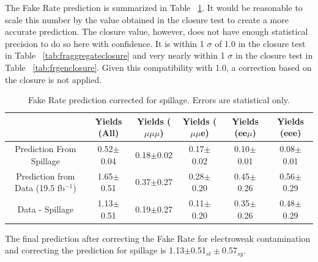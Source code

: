 The Fake Rate prediction is summarized in Table ~\ref{tab:FRPrediction}. It would be reasonable to scale this number by the value obtained in the closure test to create a more accurate prediction. The closure value, however, does not have enough statistical precision to do so here with confidence. It is within 1 $\sigma$ of 1.0 in the closure test in Table ~\ref{tab:fraggregateclosure} and very nearly within 1 $\sigma$ in the closure test in Table ~\ref{tab:frgenclosure}. Given this compatibility with 1.0, a correction based on the closure is not applied.\\

\begin{table}[ht!]
\begin{center}
\caption{\small \label{tab:FRPrediction} Fake Rate prediction corrected for spillage. Errors are statistical only.}
\begin{tabular}{c|ccccc}\hline
                                              &Yields (All)      &Yields ($\mu\mu\mu$)  &Yields ($\mu\mu$e)  &Yields (ee$\mu$)  &Yields (eee)\\
\hline \hline
Prediction From Spillage                      & 0.52$\pm$0.04   & 0.18$\pm$0.02   & 0.17$\pm$0.02   & 0.10$\pm$0.01   & 0.08$\pm$0.01 \\ 
\hline
Prediction from Data (19.5 fb$^{-1}$)          & 1.65$\pm$0.51   & 0.37$\pm$0.27   & 0.28$\pm$0.20   & 0.45$\pm$0.26   & 0.56$\pm$0.29 \\
\hline
Data - Spillage                               & 1.13$\pm$0.51   & 0.19$\pm$0.27   & 0.11$\pm$0.20   & 0.35$\pm$0.26   & 0.48$\pm$0.29 \\
\end{tabular}
\end{center}
\end{table}


The final prediction after correcting the Fake Rate for electroweak contamination and correcting the prediction for spillage is 1.13$\pm$0.51$_{st} \pm$0.57$_{sy}$.
















		
